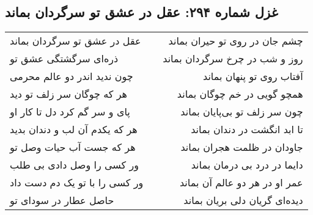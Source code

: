 \begin{center}
\section*{غزل شماره ۲۹۴: عقل در عشق تو سرگردان بماند}
\label{sec:294}
\begin{longtable}{l p{0.5cm} r}
عقل در عشق تو سرگردان بماند
&&
چشم جان در روی تو حیران بماند
\\
ذره‌ای سرگشتگی عشق تو
&&
روز و شب در چرخ سرگردان بماند
\\
چون ندید اندر دو عالم محرمی
&&
آفتاب روی تو پنهان بماند
\\
هر که چوگان سر زلف تو دید
&&
همچو گویی در خم چوگان بماند
\\
پای و سر گم کرد دل تا کار او
&&
چون سر زلف تو بی‌پایان بماند
\\
هر که یکدم آن لب و دندان بدید
&&
تا ابد انگشت در دندان بماند
\\
هر که جست آب حیات وصل تو
&&
جاودان در ظلمت هجران بماند
\\
ور کسی را وصل دادی بی طلب
&&
دایما در درد بی درمان بماند
\\
ور کسی را با تو یک دم دست داد
&&
عمر او در هر دو عالم آن بماند
\\
حاصل عطار در سودای تو
&&
دیده‌ای گریان دلی بریان بماند
\\
\end{longtable}
\end{center}
